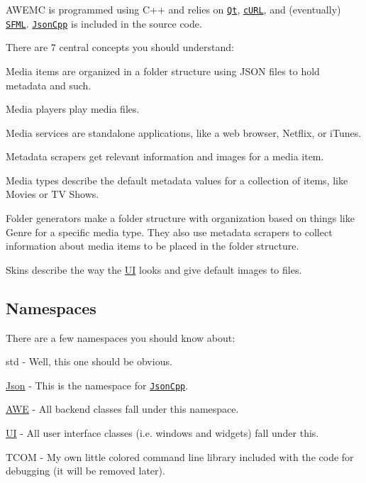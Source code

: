 A\-W\-E\-M\-C is programmed using C++ and relies on \href{http://www.qt-project.org/>}{\tt Qt}, \href{http://curl.haxx.se/>}{\tt c\-U\-R\-L}, and (eventually) \href{http://www.sfml-dev.org/>}{\tt S\-F\-M\-L}. \href{http://jsoncpp.sourceforge.net/>}{\tt Json\-Cpp} is included in the source code.

There are 7 central concepts you should understand\-:


\begin{DoxyItemize}
\item Media items are organized in a folder structure using J\-S\-O\-N files to hold metadata and such.
\item Media players play media files.
\item Media services are standalone applications, like a web browser, Netflix, or i\-Tunes.
\item Metadata scrapers get relevant information and images for a media item.
\item Media types describe the default metadata values for a collection of items, like Movies or T\-V Shows.
\item Folder generators make a folder structure with organization based on things like Genre for a specific media type. They also use metadata scrapers to collect information about media items to be placed in the folder structure.
\item Skins describe the way the \hyperlink{namespace_u_i}{U\-I} looks and give default images to files.
\end{DoxyItemize}

\subsection*{Namespaces}

There are a few namespaces you should know about\-:


\begin{DoxyItemize}
\item {\ttfamily std} -\/ Well, this one should be obvious.
\item {\ttfamily \hyperlink{namespace_json}{Json}} -\/ This is the namespace for \href{http://jsoncpp.sourceforge.net/>}{\tt Json\-Cpp}.
\item {\ttfamily \hyperlink{namespace_a_w_e}{A\-W\-E}} -\/ All backend classes fall under this namespace.
\item {\ttfamily \hyperlink{namespace_u_i}{U\-I}} -\/ All user interface classes (i.\-e. windows and widgets) fall under this.
\item {\ttfamily T\-C\-O\-M} -\/ My own little colored command line library included with the code for debugging (it will be removed later). 
\end{DoxyItemize}